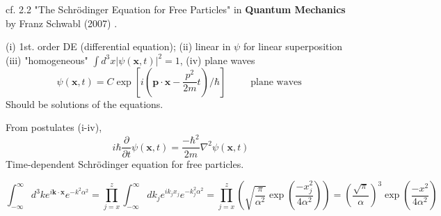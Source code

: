 cf. 2.2 "The Schr\"{o}dinger Equation for Free Particles" in \textbf{Quantum Mechanics} by Franz Schwabl (2007) \cite{agat:FrSc2007}.

(i) 1st. order DE (differential equation); (ii) linear in $\psi$ for linear superposition (iii) "homogeneous" $\int d^3x | \psi(\mathbf{x}, t) |^2 = 1$, (iv) plane waves
\[
\psi(\mathbf{x},t) = C \exp{ \left[ i (\mathbf{p} \cdot \mathbf{x} - \frac{p^2}{2m} t)/ \hbar\right]} \qquad \, \text{ plane waves }
\]
Should be solutions of the equations.

From postulates (i-iv),
\[
i \hbar \frac{\partial}{ \partial t} \psi(\mathbf{x}, t) = \frac{ -\hbar^2}{2m } \nabla^2 \psi(\mathbf{x},t)
\]
Time-dependent Schr\"{o}dinger equation for free particles.

\[
\int_{-\infty}^{\infty} d^3k e^{i\mathbf{k} \cdot \mathbf{x}} e^{-k^2 \alpha^2} = \prod_{j=x}^z \int_{-\infty}^{\infty} dk_j e^{ik_j x_j} e^{-k_j^2 \alpha^2}  = \prod_{j=x}^z \left( \sqrt{ \frac{\pi}{\alpha^2} } \exp{ \left( \frac{-x_j^2}{4\alpha^2} \right)} \right) = \left( \frac{\sqrt{\pi}}{\alpha} \right)^3 \exp{ \left( \frac{-x^2}{4\alpha^2} \right)}
\]


